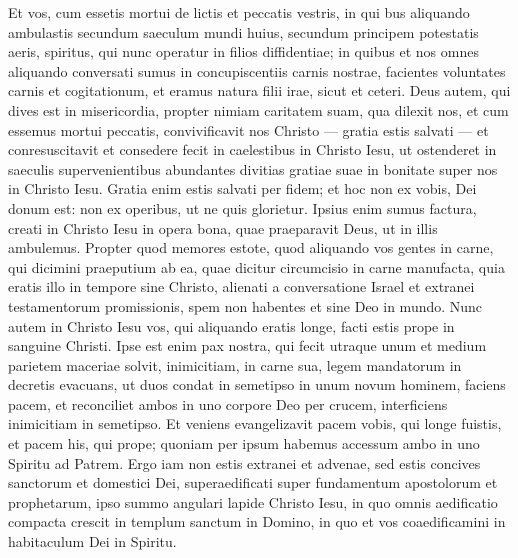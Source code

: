 \begin{biblechapter}
\begin{biblechapter}
\verse Et vos, cum essetis mortui de lictis et peccatis vestris, 
\verse in qui bus aliquando ambulastis secundum saeculum mundi huius, secundum principem potestatis aeris, spiritus, qui nunc operatur in filios diffidentiae; 
\verse in quibus et nos omnes aliquando conversati sumus in concupiscentiis carnis nostrae, facientes voluntates carnis et cogitationum, et eramus natura filii irae, sicut et ceteri. 
\verse Deus autem, qui dives est in misericordia, propter nimiam caritatem suam, qua dilexit nos, 
\verse et cum essemus mortui peccatis, convivificavit nos Christo — gratia estis salvati — 
\verse et conresuscitavit et consedere fecit in caelestibus in Christo Iesu, 
\verse ut ostenderet in saeculis supervenientibus abundantes divitias gratiae suae in bonitate super nos in Christo Iesu. 
\verse Gratia enim estis salvati per fidem; et hoc non ex vobis, Dei donum est: 
\verse non ex operibus, ut ne quis glorietur. 
\verse Ipsius enim sumus factura, creati in Christo Iesu in opera bona, quae praeparavit Deus, ut in illis ambulemus.
 \verse Propter quod memores estote, quod aliquando vos gentes in carne, qui dicimini praeputium ab ea, quae dicitur circumcisio in carne manufacta, 
\verse quia eratis illo in tempore sine Christo, alienati a conversatione Israel et extranei testamentorum promissionis, spem non habentes et sine Deo in mundo. 
\verse Nunc autem in Christo Iesu vos, qui aliquando eratis longe, facti estis prope in sanguine Christi. 
\verse Ipse est enim pax nostra, qui fecit utraque unum et medium parietem maceriae solvit, inimicitiam, in carne sua, 
\verse legem mandatorum in decretis evacuans, ut duos condat in semetipso in unum novum hominem, faciens pacem, 
\verse et reconciliet ambos in uno corpore Deo per crucem, interficiens inimicitiam in semetipso. 
\verse Et veniens evangelizavit pacem vobis, qui longe fuistis, et pacem his, qui prope; 
\verse quoniam per ipsum habemus accessum ambo in uno Spiritu ad Patrem.
 \verse Ergo iam non estis extranei et advenae, sed estis concives sanctorum et domestici Dei, 
\verse superaedificati super fundamentum apostolorum et prophetarum, ipso summo angulari lapide Christo Iesu, 
\verse in quo omnis aedificatio compacta crescit in templum sanctum in Domino, 
\verse in quo et vos coaedificamini in habitaculum Dei in Spiritu.
 

\end{biblechapter}
\end{biblechapter}

